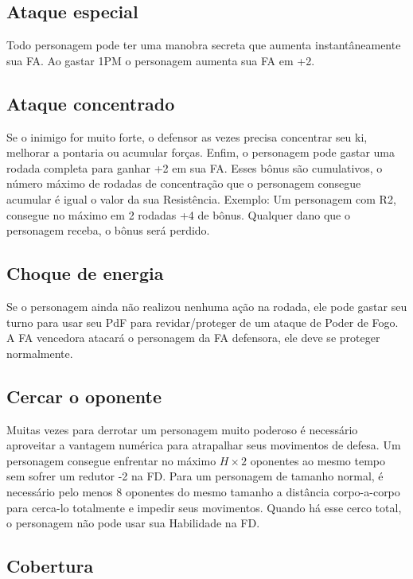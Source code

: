 \subsection{Ataque especial}

Todo personagem pode ter uma manobra secreta que aumenta instantâneamente sua FA. Ao gastar 1PM o personagem aumenta sua FA em +2.

\subsection{Ataque concentrado}

Se o inimigo for muito forte, o defensor as vezes precisa concentrar seu ki, melhorar a pontaria ou acumular forças. Enfim, o personagem pode gastar uma rodada completa para ganhar +2 em sua FA. Esses bônus são cumulativos, o número máximo de rodadas de concentração que o personagem consegue acumular é igual o valor da sua Resistência. Exemplo: Um personagem com R2, consegue no máximo em 2 rodadas +4 de bônus. Qualquer dano que o personagem receba, o bônus será perdido.

\subsection{Choque de energia}

Se o personagem ainda não realizou nenhuma ação na rodada, ele pode gastar seu turno para usar seu PdF para revidar/proteger de um ataque de Poder de Fogo. A FA vencedora atacará o personagem da FA defensora, ele deve se proteger normalmente.

\subsection{Cercar o oponente}

Muitas vezes para derrotar um personagem muito poderoso é necessário aproveitar a vantagem numérica para atrapalhar seus movimentos de defesa. Um personagem consegue enfrentar no máximo \( H \times 2 \) oponentes ao mesmo tempo sem sofrer um redutor -2 na FD. Para um personagem de tamanho  normal, é necessário pelo menos 8 oponentes do mesmo tamanho a distância corpo-a-corpo para cerca-lo totalmente e impedir seus movimentos. Quando há esse cerco total, o personagem não pode usar sua Habilidade na FD.

\subsection{Cobertura}

